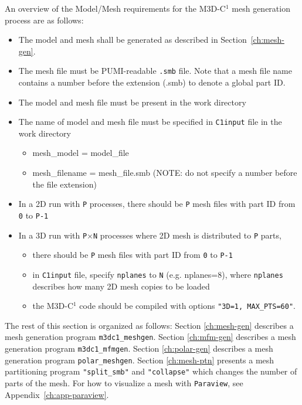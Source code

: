 An overview of the Model/Mesh requirements for the M3D-C$^{1}$ mesh generation process are as follows:
\begin{itemize}
\item	The model and mesh shall be generated as described in Section~\ref{ch:mesh-gen}.
\item	The mesh file must be PUMI-readable \texttt{.smb} file. Note that a mesh file name contains a number before the extension (.smb) to denote a global part ID.
\item	The model and mesh file must be present in the work directory
\item	The name of model and mesh file must be specified in \texttt{C1input} file in the work directory
\begin{itemize}
\item	mesh\_model = model\_file
\item	mesh\_filename = mesh\_file.smb (NOTE: do not specify a number before the file extension)
\end{itemize}
\item In a 2D run with \texttt{P} processes, there should be \texttt{P} mesh files with part ID from \texttt{0} to \texttt{P-1}
\item	In a 3D run with \texttt{P$\times$N} processes where 2D mesh is distributed to \texttt{P} parts, 
\begin{itemize}
\item	there should be \texttt{P} mesh files with part ID from \texttt{0} to \texttt{P-1}
\item	in \texttt{C1input} file, specify \texttt{nplanes} to \texttt{N} (e.g. nplanes=8), where \texttt{nplanes} describes how many 2D mesh copies to be loaded
\item	the M3D-C$^{1}$ code should be compiled with options \texttt{"3D=1, MAX\_PTS=60"}.
\end{itemize}
\end{itemize}

The rest of this section is organized as follows: Section \ref{ch:mesh-gen} describes a mesh generation program \texttt{m3dc1\_meshgen}. Section \ref{ch:mfm-gen} describes a mesh generation program \texttt{m3dc1\_mfmgen}. Section \ref{ch:polar-gen} describes a mesh generation program \texttt{polar\_meshgen}. Section \ref{ch:mesh-ptn} presents a mesh partitioning program \texttt{"split\_smb"} and \texttt{"collapse"} which changes the number of parts of the mesh. For how to visualize a mesh with \texttt{Paraview}, see Appendix~\ref{ch:app-paraview}.

